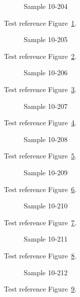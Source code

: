 \begin{figure}[tbhp]
\caption{Sample 10-204}
\label{fig:sample-10-204}
\end{figure}

Test reference Figure~\ref{fig:sample-10-204}.

\begin{figure}[tbhp]
\caption{Sample 10-205}
\label{fig:sample-10-205}
\end{figure}

Test reference Figure~\ref{fig:sample-10-205}.

\begin{figure}[tbhp]
\caption{Sample 10-206}
\label{fig:sample-10-206}
\end{figure}

Test reference Figure~\ref{fig:sample-10-206}.

\begin{figure}[tbhp]
\caption{Sample 10-207}
\label{fig:sample-10-207}
\end{figure}

Test reference Figure~\ref{fig:sample-10-207}.

\begin{figure}[tbhp]
\caption{Sample 10-208}
\label{fig:sample-10-208}
\end{figure}

Test reference Figure~\ref{fig:sample-10-208}.

\begin{figure}[tbhp]
\caption{Sample 10-209}
\label{fig:sample-10-209}
\end{figure}

Test reference Figure~\ref{fig:sample-10-209}.

\begin{figure}[tbhp]
\caption{Sample 10-210}
\label{fig:sample-10-210}
\end{figure}

Test reference Figure~\ref{fig:sample-10-210}.

\begin{figure}[tbhp]
\caption{Sample 10-211}
\label{fig:sample-10-211}
\end{figure}

Test reference Figure~\ref{fig:sample-10-211}.

\begin{figure}[tbhp]
\caption{Sample 10-212}
\label{fig:sample-10-212}
\end{figure}

Test reference Figure~\ref{fig:sample-10-212}.

